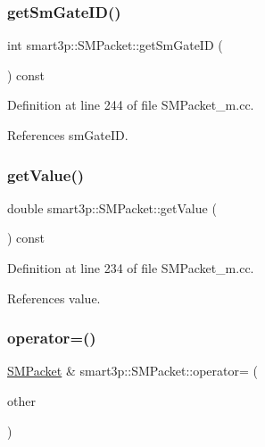 \subsubsection{\texorpdfstring{get\+Sm\+Gate\+I\+D()}{getSmGateID()}}
{\footnotesize\ttfamily int smart3p\+::\+S\+M\+Packet\+::get\+Sm\+Gate\+ID (\begin{DoxyParamCaption}{ }\end{DoxyParamCaption}) const\hspace{0.3cm}{\ttfamily [virtual]}}



Definition at line 244 of file S\+M\+Packet\+\_\+m.\+cc.



References sm\+Gate\+ID.

\mbox{\label{classsmart3p_1_1SMPacket_a4278cf44eab393e432f284f8e846c602}} 
\subsubsection{\texorpdfstring{get\+Value()}{getValue()}}
{\footnotesize\ttfamily double smart3p\+::\+S\+M\+Packet\+::get\+Value (\begin{DoxyParamCaption}{ }\end{DoxyParamCaption}) const\hspace{0.3cm}{\ttfamily [virtual]}}



Definition at line 234 of file S\+M\+Packet\+\_\+m.\+cc.



References value.

\mbox{\label{classsmart3p_1_1SMPacket_a9f61efd109fbd0c599a9fd07309392f4}} 
\subsubsection{\texorpdfstring{operator=()}{operator=()}}
{\footnotesize\ttfamily \hyperlink{classsmart3p_1_1SMPacket}{S\+M\+Packet} \& smart3p\+::\+S\+M\+Packet\+::operator= (\begin{DoxyParamCaption}\item[{const \hyperlink{classsmart3p_1_1SMPacket}{S\+M\+Packet} \&}]{other }\end{DoxyParamCaption})}



